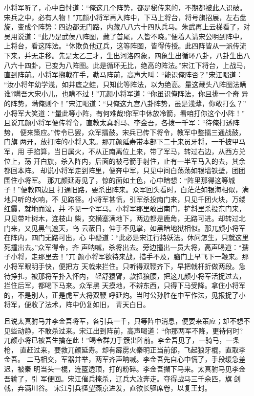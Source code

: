 小将军听了，心中自忖道：“俺这几个阵势，都是秘传来的，不期都被此人识破。
宋兵之中，必有人物！”兀颜小将军再入阵中，下马上将台，将号旗招展，左右盘
旋，变成个阵势：四边都无门路，内藏八八六十四队兵马。朱武再上云梯看了，对
吴用说道：“此乃是武侯八阵图，藏了首尾，人皆不晓。”便着人请宋公明到阵中，
上将台，看这阵法。“休欺负他辽兵，这等阵图，皆得传授。此四阵皆从一派传流
下来，并无走移。先是太乙三才，生出河洛四象，四象生出循环八卦，八卦生出八
八六十四卦，已变为八阵图。此是循环无比，绝高的阵法。”宋江下将台，上战马，
直到阵前。小将军搠戟在手，勒马阵前，高声大叫：“能识俺阵否？”宋江喝道：
“汝小将年幼学浅，如井底之蛙，只知此等阵法，以为绝高。量这藏头八阵图法瞒
谁?瞒吾大宋小儿，也瞒不过！”兀颜小将军道：“你虽识俺阵法，你且排一个奇
异的阵势，瞒俺则个！”宋江喝道：“只俺这九宫八卦阵势，虽是浅薄，你敢打么？”
小将军大笑道：“量此等小阵，有何难哉!你军中休放冷箭，看咱打你这个小阵！”
且说兀颜小将军便传将令，直教太真驸马、李金吾，各拨一千军：“待俺打透阵势，
便来策应。”传令已罢，众军擂鼓。宋兵已传下将令，教军中整擂三通战鼓，门旗
两开，放打阵的小将入来。那兀颜延寿带本部下二十来员牙将，一千披甲马军，用
手掐算，当日属火，不从正南离位上来，带了军马，转过右边，从西方兑位上，荡
开白旗，杀入阵内，后面的被弓箭手射住，止有一半军马入的去，其余都回本阵。
却说小将军走到阵里，便奔中军，只见中间白荡荡如银墙铁壁，团团围住小将军。
那兀颜延寿见了，惊的面如土色，心中暗想：“阵里那得这等城子！”便教四边且
打通旧路，要杀出阵来。众军回头看时，白茫茫如银海相似，满地只听的水响，不
见路径。小将军甚慌，引军杀投南门来，只见千团火块，万缕红霞，就地而滚，并
不见一个军马。小将军那里敢出南门，铲斜里杀投东门来，只见带叶树木，连枝山
柴，交横塞满地下，两边都是鹿角，无路可进。却转过北门来，又见黑气遮天，乌
云蔽日，伸手不见掌，如黑暗地狱相似。那兀颜小将军在阵内，四门无路可出，心
中疑道：“此必是宋江行持妖法。休问怎生，只就这里死撞出去。”众军得令，齐
声呐喊，杀将出去。旁边撞出一员大将，高声喝道：“孺子小将，走那里去！”兀
颜小将军欲待来战，措手不及，脑门上早飞下一鞭来。那小将军眼明手快，便把方
天戟来拦住。只听得双鞭齐下，早把戟杆折做两段。急待挣扎，被那将军扑入怀内，
轻舒猿臂，款扭狼腰，把这兀颜小将军活捉过去，拦住后军，都喝下马来。众军黑
天摸地，不辨东西，只得下马受降。拿住小将军的，不是别人，正是虎军大将双鞭
呼延灼。当时公孙胜在中军作法，见报捉了小将军，便收了法术，阵中仍复如旧，
青天白日。

且说太真驸马并李金吾将军，各引兵一千，只等阵中消息，便要来策应；却不想不
见些动静，不敢杀过来。宋江出到阵前，高声喝道：“你那两军不降，更待何时?
兀颜小将已被吾生擒在此！”喝令群刀手簇出阵前。李金吾见了，一骑马，一条枪，
直赶过来，要救兀颜延寿。却有霹雳火秦明正当前部，飞起狼牙棍，直取李金吾。
二马相交，军器并举，两军齐声呐喊。李金吾先自心中慌了，手段缓急差迟，被秦
明当头一棍，连盔透顶，打的粉碎。李金吾攧下马来。太真驸马见李金吾输了，引
军便回。宋江催兵掩杀，辽兵大败奔走。夺得战马三千余匹，旗剑戟，弃满川谷。
宋江引兵径望燕京进发，直欲长驱席卷，以复王封。

